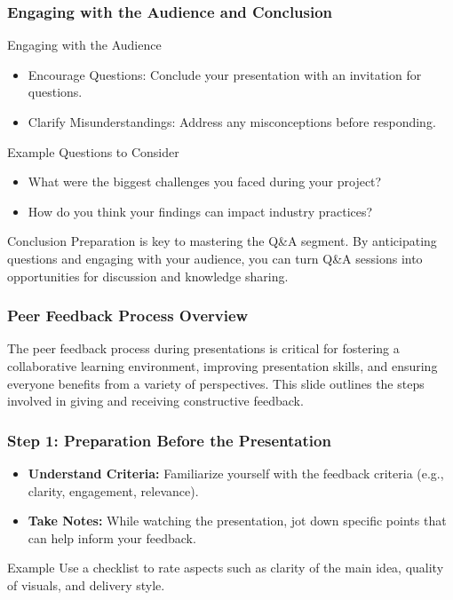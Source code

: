 \documentclass[aspectratio=169]{beamer}
\begin{document}
\begin{frame}[fragile]
    \frametitle{Engaging with the Audience and Conclusion}
    \begin{block}{Engaging with the Audience}
        \begin{itemize}
            \item Encourage Questions: Conclude your presentation with an invitation for questions.
            \item Clarify Misunderstandings: Address any misconceptions before responding.
        \end{itemize}
    \end{block}
    
    \begin{block}{Example Questions to Consider}
        \begin{itemize}
            \item What were the biggest challenges you faced during your project?
            \item How do you think your findings can impact industry practices?
        \end{itemize}
    \end{block}

    \begin{block}{Conclusion}
        Preparation is key to mastering the Q\&A segment. By anticipating questions and engaging with your audience, you can turn Q\&A sessions into opportunities for discussion and knowledge sharing.
    \end{block}
\end{frame}

\begin{frame}[fragile]
    \frametitle{Peer Feedback Process Overview}
    The peer feedback process during presentations is critical for fostering a collaborative learning environment, improving presentation skills, and ensuring everyone benefits from a variety of perspectives. This slide outlines the steps involved in giving and receiving constructive feedback.
\end{frame}

\begin{frame}[fragile]
    \frametitle{Step 1: Preparation Before the Presentation}
    \begin{itemize}
        \item \textbf{Understand Criteria:} Familiarize yourself with the feedback criteria (e.g., clarity, engagement, relevance).
        \item \textbf{Take Notes:} While watching the presentation, jot down specific points that can help inform your feedback.
    \end{itemize}
    
    \begin{block}{Example}
        Use a checklist to rate aspects such as clarity of the main idea, quality of visuals, and delivery style.
    \end{block}
\end{frame}
\end{document}
